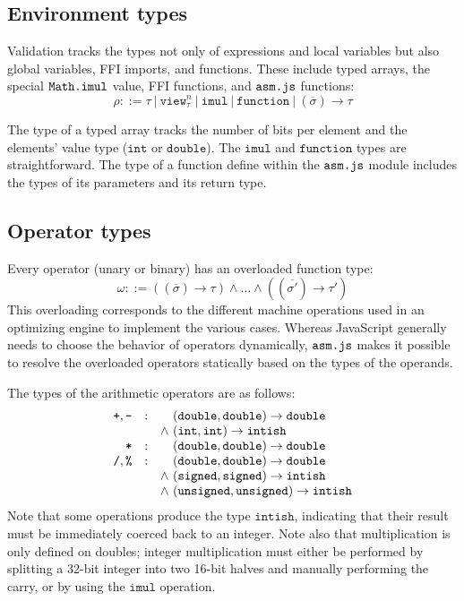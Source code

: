 \documentclass{article}
\newcommand{\funty}[2]{({#1}) \rightarrow {#2}}
\newcommand{\seq}[1]{\overline{{#1}}}
\newcommand{\mathjs}[1]{\mbox{\texttt{{#1}}}}
\newcommand{\unsigned}{\mathtt{unsigned}}
\newcommand{\signed}{\mathtt{signed}}
\newcommand{\double}{\mathtt{double}}
\newcommand{\view}[2]{\mathtt{view}^{#1}_{#2}}
\renewcommand{\int}{\mathtt{int}}
\newcommand{\function}{\mathtt{function}}
\newcommand{\imul}{\mathtt{imul}}
\newcommand{\intish}{\mathtt{intish}}
\begin{document}
\subsection{Environment types}

Validation tracks the types not only of expressions and local
variables but also global variables, FFI imports, and functions. These
include typed arrays, the special $\mathjs{Math.imul}$ value, FFI
functions, and $\mathjs{asm.js}$ functions:
\[
\rho ::= \tau ~|~ \view{n}{\tau} ~|~ \imul ~|~ \function ~|~ \funty{\seq{\sigma}}{\tau}
\]

The type of a typed array tracks the number of bits per element and
the elements' value type ($\int$ or $\double$). The $\imul$ and
$\function$ types are straightforward. The type of a function define
within the $\mathjs{asm.js}$ module includes the types of its
parameters and its return type.

\subsection{Operator types}

Every operator (unary or binary) has an overloaded function type:
\[
\omega ::= (\funty{\seq{\sigma}}{\tau}) \land \ldots \land (\funty{\seq{\sigma'}}{\tau'})
\]
This overloading corresponds to the different machine operations used
in an optimizing engine to implement the various cases. Whereas
JavaScript generally needs to choose the behavior of operators
dynamically, $\mathjs{asm.js}$ makes it possible to resolve the
overloaded operators statically based on the types of the operands.

The types of the arithmetic operators are as follows:
\[
\begin{array}{rcc@{\ }l}
\mathjs{+}, \mathjs{-}
                 & : &       & \funty{\double, \double}{\double} \\
                 &   & \land & \funty{\int, \int}{\intish} \\
\mathjs{*}       & : &       & \funty{\double, \double}{\double} \\
\mathjs{/}, \mathjs{\%}
                 & : &       & \funty{\double, \double}{\double} \\
                 &   & \land & \funty{\signed, \signed}{\intish}  \\
                 &   & \land & \funty{\unsigned, \unsigned}{\intish} \\
\end{array}
\]
Note that some operations produce the type $\intish$, indicating that
their result must be immediately coerced back to an integer. Note also
that multiplication is only defined on doubles; integer multiplication
must either be performed by splitting a 32-bit integer into two 16-bit
halves and manually performing the carry, or by using the $\imul$
operation.
\end{document}
